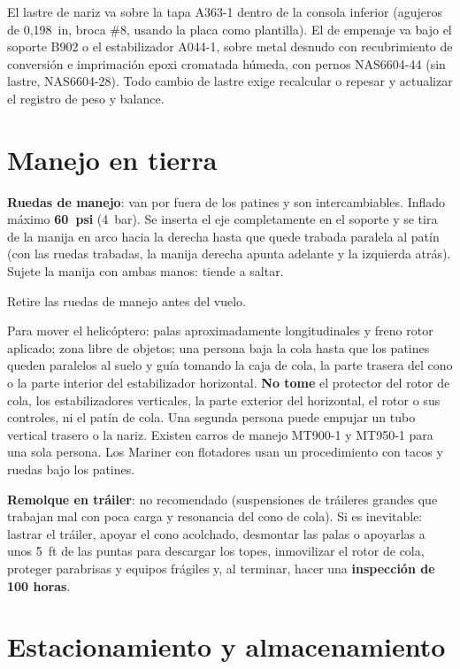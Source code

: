 El lastre de nariz va sobre la tapa A363-1 dentro de la consola inferior (agujeros de 0,198~in, broca \#8, usando la placa como plantilla). El de empenaje va bajo el soporte B902 o el estabilizador A044-1, sobre metal desnudo con recubrimiento de conversión e imprimación epoxi cromatada húmeda, con pernos NAS6604-44 (sin lastre, NAS6604-28). Todo cambio de lastre exige recalcular o repesar y actualizar el registro de peso y balance.

\section{Manejo en tierra}

\textbf{Ruedas de manejo}: van por fuera de los patines y son intercambiables. Inflado máximo \textbf{60~psi} (4~bar). Se inserta el eje completamente en el soporte y se tira de la manija en arco hacia la derecha hasta que quede trabada paralela al patín (con las ruedas trabadas, la manija derecha apunta adelante y la izquierda atrás). Sujete la manija con ambas manos: tiende a saltar.

\begin{advertencia}
Retire las ruedas de manejo antes del vuelo.
\end{advertencia}

Para mover el helicóptero: palas aproximadamente longitudinales y freno rotor aplicado; zona libre de objetos; una persona baja la cola hasta que los patines queden paralelos al suelo y guía tomando la caja de cola, la parte trasera del cono o la parte interior del estabilizador horizontal. \textbf{No tome} el protector del rotor de cola, los estabilizadores verticales, la parte exterior del horizontal, el rotor o sus controles, ni el patín de cola. Una segunda persona puede empujar un tubo vertical trasero o la nariz. Existen carros de manejo MT900-1 y MT950-1 para una sola persona. Los Mariner con flotadores usan un procedimiento con tacos y ruedas bajo los patines.

\textbf{Remolque en tráiler}: no recomendado (suspensiones de tráileres grandes que trabajan mal con poca carga y resonancia del cono de cola). Si es inevitable: lastrar el tráiler, apoyar el cono acolchado, desmontar las palas o apoyarlas a unos 5~ft de las puntas para descargar los topes, inmovilizar el rotor de cola, proteger parabrisas y equipos frágiles y, al terminar, hacer una \textbf{inspección de 100 horas}.

\section{Estacionamiento y almacenamiento}

